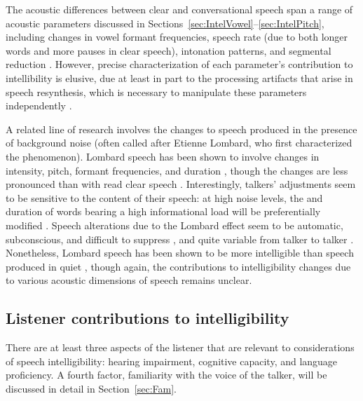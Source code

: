 The acoustic differences between clear and conversational speech span a range of acoustic parameters discussed in Sections~\ref{sec:IntelVowel}–\ref{sec:IntelPitch}, including changes in vowel formant frequencies, speech rate (due to both longer words and more pauses in clear speech), intonation patterns, and segmental reduction \citep[see][\intal]{PichenyEtAl1986, LiLoizou2008, SmiljanicBradlow2008, HazanBaker2011}.  However, precise characterization of each parameter’s contribution to intellibility is elusive, due at least in part to the processing artifacts that arise in speech resynthesis, which is necessary to manipulate these parameters independently \citep[cf. discussions in][]{PichenyEtAl1989, UchanskiEtAl1996, LiuZeng2006, KrauseBraida2009}.

A related line of research involves the changes to speech produced in the presence of background noise (often called  after Etienne Lombard, who first characterized the phenomenon).  Lombard speech has been shown to involve changes in intensity, pitch, formant frequencies, and duration \citep{LaneTranel1971, SummersEtAl1988}, though the changes are less pronounced than with read clear speech \citep{HazanBaker2011}.  Interestingly, talkers’ adjustments seem to be sensitive to the content of their speech: at high noise levels, the \fo{} and duration of words bearing a high informational load will be preferentially modified \citep{PatelSchell2008}.  Speech alterations due to the Lombard effect seem to be automatic, subconscious, and difficult to suppress \citep{PickEtAl1989}, and quite variable from talker to talker \citep{Junqua1993}.  Nonetheless, Lombard speech has been shown to be more intelligible than speech produced in quiet \citep{DreherONeill1957, SummersEtAl1988}, though again, the contributions to intelligibility changes due to various acoustic dimensions of speech remains unclear.


\subsection{Listener contributions to intelligibility}
There are at least three aspects of the listener that are relevant to considerations of speech intelligibility: hearing impairment, cognitive capacity, and language proficiency.  A fourth factor, familiarity with the voice of the talker, will be discussed in detail in Section~\ref{sec:Fam}.  


